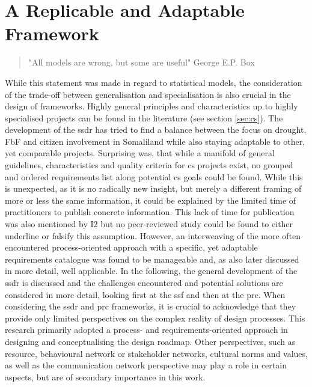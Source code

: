 \section{A Replicable and Adaptable Framework}

\begin{quote}
    "All models are wrong, but some are useful" George E.P. Box
\end{quote}

While this statement was made in regard to statistical models, the consideration of the trade-off between generalisation and specialisation is also crucial in the design of frameworks. Highly general principles and characteristics up to highly specialised projects can be found in the literature (see section \ref{sec:cs}). The development of the \acrshort{ssdr} has tried to find a balance between the focus on drought, FbF and citizen involvement in Somaliland while also staying adaptable to other, yet comparable projects.\newline
Surprising was, that while a manifold of general guidelines, characteristics and quality criteria for \acrlong{cs} projects exist, no grouped and ordered requirements list along potential \acrshort{cs} goals could be found. While this is unexpected, as it is no radically new insight, but merely a different framing of more or less the same information, it could be explained by the limited time of practitioners to publish concrete information. This lack of time for publication was also mentioned by I2 but no peer-reviewed study could be found to either underline or falsify this assumption. However, an interweaving of the more often encountered process-oriented approach with a specific, yet adaptable requirements catalogue was found to be manageable and, as also later discussed in more detail, well applicable.\newline
In the following, the general development of the \acrshort{ssdr} is discussed and the challenges encountered and potential solutions are considered in more detail, looking first at the \acrshort{ssf} and then at the \acrshort{prc}. When considering the \acrshort{ssdr} and \acrshort{prc} frameworks, it is crucial to acknowledge that they provide only limited perspectives on the complex reality of design processes. This research primarily adopted a process- and requirements-oriented approach in designing and conceptualising the design roadmap. Other perspectives, such as resource, behavioural network or stakeholder networks, cultural norms and values, as well as the communication network perspective may play a role in certain aspects, but are of secondary importance in this work.\newline
